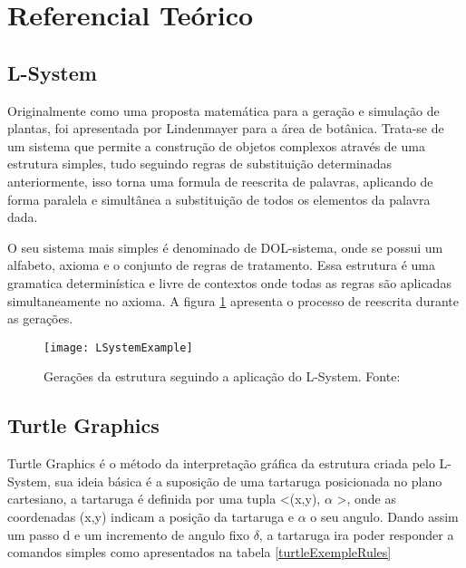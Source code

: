 \section{Referencial Teórico}

\subsection{L-System}
Originalmente como uma proposta matemática para a geração e simulação de plantas, foi apresentada por Lindenmayer\cite{Prusinkiewicz} para a área de botânica. Trata-se de um sistema que permite a construção de objetos complexos através de uma estrutura simples, tudo seguindo regras de substituição determinadas anteriormente, isso torna uma formula de reescrita de palavras, aplicando de forma paralela e simultânea a substituição de todos os elementos da palavra dada. 

O seu sistema mais simples é denominado de DOL-sistema, onde se possui um alfabeto, axioma e o conjunto de regras de tratamento. Essa estrutura é uma gramatica determinística e livre de contextos onde todas as regras são aplicadas simultaneamente no axioma. A figura \ref{LSystemGenerationExemple} apresenta o processo de reescrita durante as gerações.

\begin{figure}[!h]
	\centering
	\texttt{[image: LSystemExample]}
	\caption{Gerações da estrutura seguindo a aplicação do L-System. Fonte: \cite{natureCode}}
	\label{LSystemGenerationExemple}
\end{figure}

\subsection{Turtle Graphics} 
Turtle Graphics\cite{Abelson} é o método da interpretação gráfica da estrutura criada pelo L-System, sua ideia básica é a suposição de uma tartaruga posicionada no plano cartesiano, a tartaruga é definida por uma tupla <(x,y), $\alpha$ >, onde as coordenadas (x,y) indicam a posição da tartaruga e $\alpha$ o seu angulo.
Dando assim um passo d e um incremento de angulo fixo $\delta$, a tartaruga ira poder responder a comandos simples como apresentados na tabela \ref{turtleExempleRules}

